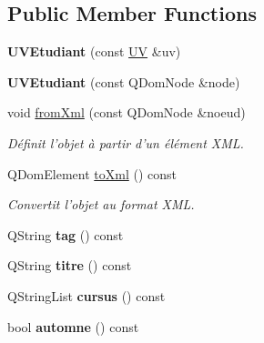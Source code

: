 \subsection*{Public Member Functions}
\begin{DoxyCompactItemize}
\item 
\hypertarget{classUVEtudiant_adf59df3b1d84f30fa08018f00091f6bd}{{\bfseries U\+V\+Etudiant} (const \hyperlink{classUV}{U\+V} \&uv)}\label{classUVEtudiant_adf59df3b1d84f30fa08018f00091f6bd}

\item 
\hypertarget{classUVEtudiant_afc5de4526603bc33c6b8445b7297a896}{{\bfseries U\+V\+Etudiant} (const Q\+Dom\+Node \&node)}\label{classUVEtudiant_afc5de4526603bc33c6b8445b7297a896}

\item 
\hypertarget{classUVEtudiant_a704e657fa6cc2ec18b5d68028ed1cb75}{void \hyperlink{classUVEtudiant_a704e657fa6cc2ec18b5d68028ed1cb75}{from\+Xml} (const Q\+Dom\+Node \&noeud)}\label{classUVEtudiant_a704e657fa6cc2ec18b5d68028ed1cb75}

\begin{DoxyCompactList}\small\item\em Définit l'objet à partir d'un élément X\+M\+L. \end{DoxyCompactList}\item 
Q\+Dom\+Element \hyperlink{classUVEtudiant_a4a4aef90cdc3207ccab922d1b8b38334}{to\+Xml} () const 
\begin{DoxyCompactList}\small\item\em Convertit l'objet au format X\+M\+L. \end{DoxyCompactList}\item 
\hypertarget{classUVEtudiant_af9fbad2a00b76ad0201c503f9c2449be}{Q\+String {\bfseries tag} () const }\label{classUVEtudiant_af9fbad2a00b76ad0201c503f9c2449be}

\item 
\hypertarget{classUVEtudiant_a8c57efeab3b71714e931e54d4ac440e6}{Q\+String {\bfseries titre} () const }\label{classUVEtudiant_a8c57efeab3b71714e931e54d4ac440e6}

\item 
\hypertarget{classUVEtudiant_a7d336ff9eff012d1d4cd928e86d1fdf3}{Q\+String\+List {\bfseries cursus} () const }\label{classUVEtudiant_a7d336ff9eff012d1d4cd928e86d1fdf3}

\item 
\hypertarget{classUVEtudiant_a454e7e10ded3888b8bc139bbfc449465}{bool {\bfseries automne} () const }\label{classUVEtudiant_a454e7e10ded3888b8bc139bbfc449465}


\end{DoxyCompactItemize}
